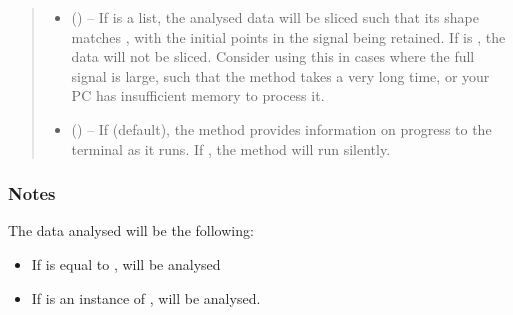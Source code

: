 \documentclass[letterpaper,10pt,english]{sphinxmanual}
\begin{document}
\begin{fulllineitems}
\begin{fulllineitems}
\begin{quote}
\begin{description}
\begin{itemize}
\item {} 
\sphinxAtStartPar
{} (\sphinxstyleliteralemphasis{\sphinxupquote{{[}}}\sphinxstyleliteralemphasis{\sphinxupquote{{]}}}\sphinxstyleliteralemphasis{\sphinxupquote{, }}\sphinxstyleliteralemphasis{\sphinxupquote{{[}}}\sphinxstyleliteralemphasis{\sphinxupquote{, }}\sphinxstyleliteralemphasis{\sphinxupquote{{]}}}\sphinxstyleliteralemphasis{\sphinxupquote{, }}) – If  is a list, the analysed data will be sliced such that
its shape matches , with the initial points in the signal
being retained. If  is , the data will not be
sliced. Consider using this in cases where the full signal is
large, such that the method takes a very long time, or your PC
has insufficient memory to process it.

\item {} 
\sphinxAtStartPar
{} (\sphinxstyleliteralemphasis{\sphinxupquote{, }}) – If  (default), the method provides information on
progress to the terminal as it runs. If , the method
will run silently.

\end{itemize}

\end{description}\end{quote}
\subsubsection*{Notes}

\sphinxAtStartPar
The data analysed will be the following:
\begin{itemize}
\item {} 
\sphinxAtStartPar
If  is equal to ,  will be
analysed

\item {} 
\sphinxAtStartPar
If  is an instance of
{\hyperref[\detokenize{references/freqfilter:nmrespy.freqfilter.FrequencyFilter}]{}},
 will be analysed.


\end{itemize}
\end{fulllineitems}
\end{fulllineitems}
\end{document}
